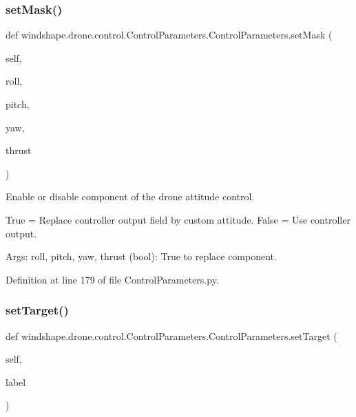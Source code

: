 \subsubsection{\texorpdfstring{set\+Mask()}{setMask()}}
{\footnotesize\ttfamily def windshape.\+drone.\+control.\+Control\+Parameters.\+Control\+Parameters.\+set\+Mask (\begin{DoxyParamCaption}\item[{}]{self,  }\item[{}]{roll,  }\item[{}]{pitch,  }\item[{}]{yaw,  }\item[{}]{thrust }\end{DoxyParamCaption})}

\begin{DoxyVerb}Enable or disable component of the drone attitude control.

True = Replace controller output field by custom attitude.
False = Use controller output.

Args:
    roll, pitch, yaw, thrust (bool): True to replace component.
\end{DoxyVerb}
 

Definition at line 179 of file Control\+Parameters.\+py.

\mbox{\label{classwindshape_1_1drone_1_1control_1_1_control_parameters_1_1_control_parameters_a51732998311ea9731b447cdd3683170d}} 
\subsubsection{\texorpdfstring{set\+Target()}{setTarget()}}
{\footnotesize\ttfamily def windshape.\+drone.\+control.\+Control\+Parameters.\+Control\+Parameters.\+set\+Target (\begin{DoxyParamCaption}\item[{}]{self,  }\item[{}]{label }\end{DoxyParamCaption})}

